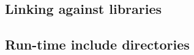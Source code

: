 \subsection{Linking against libraries}


\subsection{Run-time include directories}\label{subsec:080dev:rt_include}


